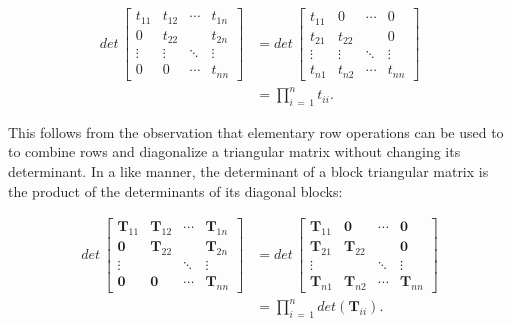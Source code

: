 \documentclass[graybox,envcountchap,sectrefs]{svmono}\usepackage[]{graphicx}\usepackage[]{xcolor}
\begin{document}
\begin{appendices}
\begin{align}
det\,\left[\begin{array}{cccc}
\mathit{t_{11}} & t_{12} & \cdots & t_{1n}\\
0 & t_{22} &  & t_{2n}\\
\vdots & \vdots & \ddots & \vdots\\
0 & 0 & \cdots & t_{nn}
\end{array}\right] & =det\,\left[\begin{array}{cccc}
\mathit{t_{11}} & 0 & \cdots & 0\\
t_{21} & t_{22} &  & 0\\
\vdots & \vdots & \ddots & \vdots\\
t_{n1} & t_{n2} & \cdots & t_{nn}
\end{array}\right]\nonumber \\[0.5em]
 & =\prod_{i\,=\,1}^{n}t_{ii}.\label{eq:TriangularMatrixDerminant}
\end{align}

This follows from the observation that elementary row operations can
be used to to combine rows and diagonalize a triangular matrix without
changing its determinant. In a like manner, the determinant of a block
triangular matrix is the product of the determinants of its diagonal
blocks:

\begin{align}
det\,\left[\begin{array}{cccc}
\mathrm{\mathbf{T}}_{11} & \mathrm{\mathbf{T}}_{12} & \cdots & \mathrm{\mathbf{T}}_{1n}\\
\mathrm{\mathbf{0}} & \mathrm{\mathbf{T}}_{22} &  & \mathrm{\mathbf{T}}_{2n}\\
\vdots &  & \ddots & \vdots\\
\mathbf{0} & \mathbf{0} & \cdots & \mathrm{\mathbf{T}}_{nn}
\end{array}\right] & =det\,\left[\begin{array}{cccc}
\mathrm{\mathbf{T}}_{11} & \mathrm{\mathbf{0}} & \cdots & \mathrm{\mathbf{0}}\\
\mathrm{\mathbf{T}}_{21} & \mathrm{\mathbf{T}}_{22} &  & \mathrm{\mathbf{0}}\\
\vdots &  & \ddots & \vdots\\
\mathrm{\mathbf{T}}_{n1} & \mathrm{\mathbf{T}}_{n2} & \cdots & \mathrm{\mathbf{T}}_{nn}
\end{array}\right]\nonumber \\[0.5em]
 & =\prod_{i\,=\,1}^{n}det\left(\mathrm{\mathbf{T}}_{ii}\right).\label{eq:BlockTriangularDeterminant}
\end{align}


\end{appendices}
\end{document}
